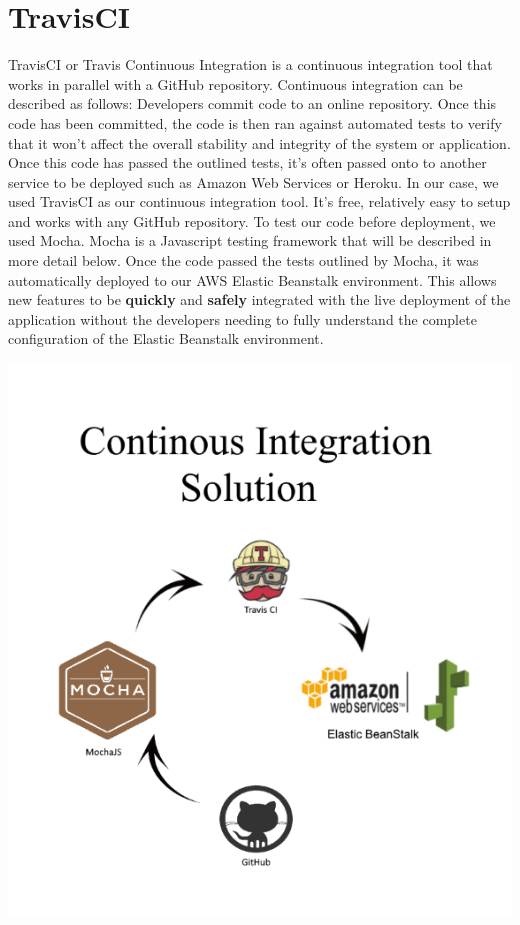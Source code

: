 \section{TravisCI}
TravisCI or Travis Continuous Integration is a continuous integration tool that works in parallel with a GitHub repository. Continuous integration can be described as follows: Developers commit code to an online repository. Once this code has been committed, the code is then ran against automated tests to verify that it won't affect the overall stability and integrity of the system or application. Once this
code has passed the outlined tests, it's often passed onto to another service to be deployed such as Amazon Web Services or Heroku. In our case, we used TravisCI as our continuous integration tool. It's free, relatively easy to setup and works with any GitHub repository. To test our code before deployment, we used Mocha. Mocha is a Javascript testing framework that will be described in more detail below. Once the code passed the tests outlined by Mocha, it was automatically deployed to our AWS Elastic Beanstalk environment. This allows new features to be \textbf{quickly} and \textbf{safely} integrated with the live deployment of the application without 
the developers needing to fully understand the complete configuration of the Elastic Beanstalk environment. 

\begin{center}    
	\includegraphics{img/SDLC.png}
\end{center}


